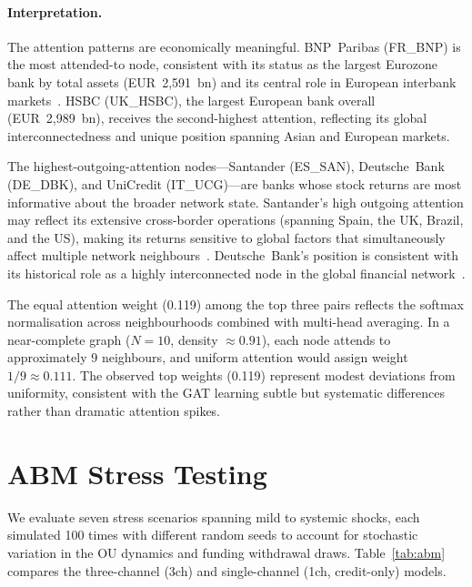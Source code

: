 \paragraph{Interpretation.}
The attention patterns are economically meaningful. BNP~Paribas (FR\_BNP) is the most attended-to node, consistent with its status as the largest Eurozone bank by total assets (EUR~2,591~bn) and its central role in European interbank markets~\cite{haldane2011systemic}. HSBC (UK\_HSBC), the largest European bank overall (EUR~2,989~bn), receives the second-highest attention, reflecting its global interconnectedness and unique position spanning Asian and European markets.

The highest-outgoing-attention nodes---Santander (ES\_SAN), Deutsche~Bank (DE\_DBK), and UniCredit (IT\_UCG)---are banks whose stock returns are most informative about the broader network state. Santander's high outgoing attention may reflect its extensive cross-border operations (spanning Spain, the UK, Brazil, and the US), making its returns sensitive to global factors that simultaneously affect multiple network neighbours~\cite{battiston2012debtrank}. Deutsche~Bank's position is consistent with its historical role as a highly interconnected node in the global financial network~\cite{battiston2016price}.

The equal attention weight (0.119) among the top three pairs reflects the softmax normalisation across neighbourhoods combined with multi-head averaging. In a near-complete graph ($N=10$, density $\approx 0.91$), each node attends to approximately 9 neighbours, and uniform attention would assign weight $1/9 \approx 0.111$. The observed top weights (0.119) represent modest deviations from uniformity, consistent with the GAT learning subtle but systematic differences rather than dramatic attention spikes.


\section{ABM Stress Testing}
\label{sec:abm-results}

We evaluate seven stress scenarios spanning mild to systemic shocks, each simulated 100 times with different random seeds to account for stochastic variation in the OU dynamics and funding withdrawal draws. Table~\ref{tab:abm} compares the three-channel (3ch) and single-channel (1ch, credit-only) models.

